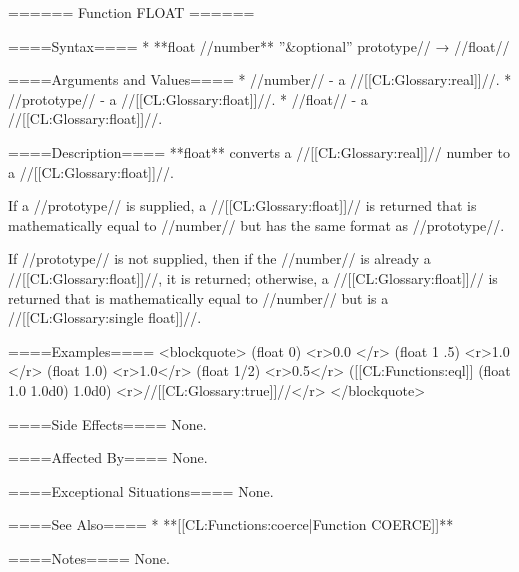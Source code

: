 ====== Function FLOAT ======

====Syntax====
  * **float //number** ''&optional'' prototype// → //float//

====Arguments and Values====
  * //number// - a //[[CL:Glossary:real]]//.
  * //prototype// - a //[[CL:Glossary:float]]//.
  * //float// - a //[[CL:Glossary:float]]//.

====Description====
**float** converts a //[[CL:Glossary:real]]// number to a //[[CL:Glossary:float]]//.

If a //prototype// is supplied, a //[[CL:Glossary:float]]// is returned that is mathematically equal to //number// but has the same format as //prototype//.

If //prototype// is not supplied, then if the //number// is already a //[[CL:Glossary:float]]//, it is returned; otherwise, a //[[CL:Glossary:float]]// is returned that is mathematically equal to //number// but is a //[[CL:Glossary:single float]]//.

====Examples====
<blockquote>
(float 0) <r>0.0 </r>
(float 1 .5) <r>1.0 </r>
(float 1.0) <r>1.0</r>
(float 1/2) <r>0.5</r>
([[CL:Functions:eql]] (float 1.0 1.0d0) 1.0d0) <r>//[[CL:Glossary:true]]//</r>
</blockquote>

====Side Effects====
None.

====Affected By====
None.

====Exceptional Situations====
None.

====See Also====
  * **[[CL:Functions:coerce|Function COERCE]]**

====Notes====
None.


